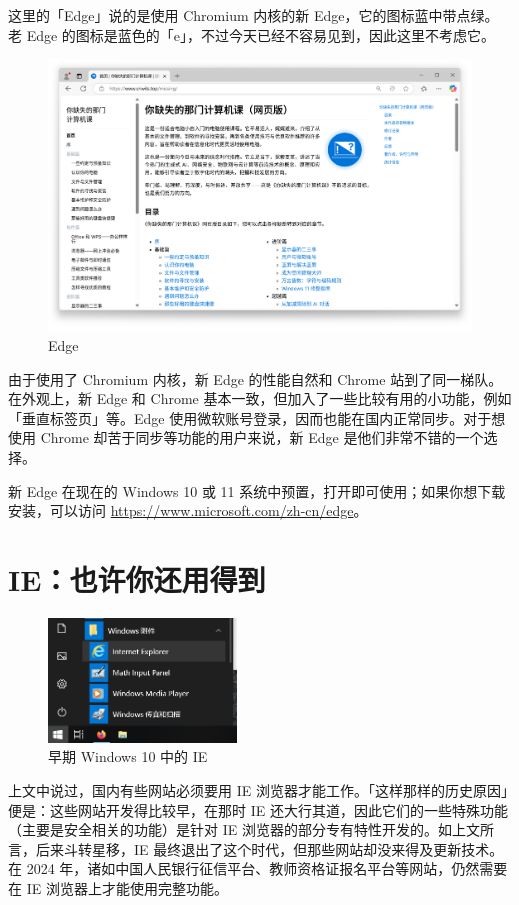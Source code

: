 这里的「Edge」说的是使用 Chromium 内核的新 Edge，它的图标蓝中带点绿。老 Edge 的图标是蓝色的「e」，不过今天已经不容易见到，因此这里不考虑它。

\begin{figure}[htb!]
  \centering
  \includegraphics[width=.7\textwidth]{assets/software/Missing_homepage_in_Edge.png}
  \caption{Edge}
  \label{fig:Missing_homepage_in_Edge}
\end{figure}

由于使用了 Chromium 内核，新 Edge 的性能自然和 Chrome 站到了同一梯队。在外观上，新 Edge 和 Chrome 基本一致，但加入了一些比较有用的小功能，例如「垂直标签页」等。Edge 使用微软账号登录，因而也能在国内正常同步。对于想使用 Chrome 却苦于同步等功能的用户来说，新 Edge 是他们非常不错的一个选择。

新 Edge 在现在的 Windows 10 或 11 系统中预置，打开即可使用；如果你想下载安装，可以访问 \url{https://www.microsoft.com/zh-cn/edge}。

\section{IE：也许你还用得到}

\begin{figure}
  \centering
  \includegraphics[width=5cm]{assets/software/IE_in_old_Windows_10.png}
  \caption{早期 Windows 10 中的 IE}
  \label{fig:IE_in_old_Windows_10}
\end{figure}

上文中说过，国内有些网站必须要用 IE 浏览器才能工作。「这样那样的历史原因」便是：这些网站开发得比较早，在那时 IE 还大行其道，因此它们的一些特殊功能（主要是安全相关的功能）是针对 IE 浏览器的部分专有特性开发的。如上文所言，后来斗转星移，IE 最终退出了这个时代，但那些网站却没来得及更新技术。在 2024 年，诸如中国人民银行征信平台、教师资格证报名平台等网站，仍然需要在 IE 浏览器上才能使用完整功能。

